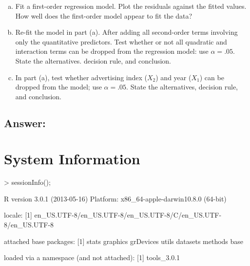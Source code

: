 \documentclass{article}
\begin{document}
\begin{enumerate}[a)]
\item{} Fit a first-order regression model. Plot the residuals against the fitted values. How well does the first-order model appear to fit the data?
\item{} Re-fit the model in part (a). After adding all second-order terms involving only the quantitative predictors. Test whether or not all quadratic and interaction terms can be dropped from the regression model: use $\alpha = .05$. State the alternatives. decision rule, and conclusion.
\item{} In part (a), test whether advertising index ($X_2$) and year ($X_1$) can be dropped from the model; use $\alpha = .05$. State the alternatives, decision rule, and conclusion.
\end{enumerate}

\subsection{Answer:}

\section{System Information}

\begin{Schunk}
\begin{Sinput}
> sessionInfo();
\end{Sinput}
\begin{Soutput}
R version 3.0.1 (2013-05-16)
Platform: x86_64-apple-darwin10.8.0 (64-bit)

locale:
[1] en_US.UTF-8/en_US.UTF-8/en_US.UTF-8/C/en_US.UTF-8/en_US.UTF-8

attached base packages:
[1] stats     graphics  grDevices utils     datasets  methods   base     

loaded via a namespace (and not attached):
[1] tools_3.0.1
\end{Soutput}
\end{Schunk}
\end{document}
